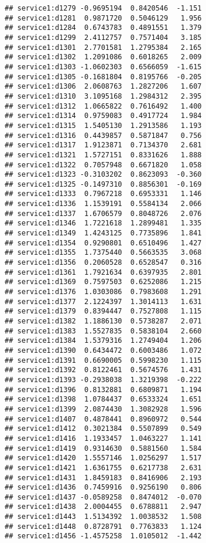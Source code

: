 \documentclass[
]{article}
\begin{document}
\begin{verbatim}
## service1:d1279 -0.9695194  0.8420546  -1.151
## service1:d1281  0.9871720  0.5046129   1.956
## service1:d1284  0.6743783  0.4891551   1.379
## service1:d1299  2.4112757  0.7571404   3.185
## service1:d1301  2.7701581  1.2795384   2.165
## service1:d1302  1.2091086  0.6018265   2.009
## service1:d1303 -1.0602303  0.6566059  -1.615
## service1:d1305 -0.1681804  0.8195766  -0.205
## service1:d1306  2.0608763  1.2827206   1.607
## service1:d1310  3.1095168  1.2984312   2.395
## service1:d1312  1.0665822  0.7616492   1.400
## service1:d1314  0.9759083  0.4917724   1.984
## service1:d1315  1.5405130  1.2913586   1.193
## service1:d1316  0.4439857  0.5871847   0.756
## service1:d1317  1.9123871  0.7134370   2.681
## service1:d1321  1.5727151  0.8331626   1.888
## service1:d1322  0.7057948  0.6671820   1.058
## service1:d1323 -0.3103202  0.8623093  -0.360
## service1:d1325 -0.1497310  0.8856301  -0.169
## service1:d1333  0.7967218  0.6953331   1.146
## service1:d1336  1.1539191  0.5584134   2.066
## service1:d1337  1.6706579  0.8048726   2.076
## service1:d1346  1.7221618  1.2899481   1.335
## service1:d1349  1.4243125  0.7735896   1.841
## service1:d1354  0.9290801  0.6510496   1.427
## service1:d1355  1.7375440  0.5663535   3.068
## service1:d1356  0.2060528  0.6528547   0.316
## service1:d1361  1.7921634  0.6397935   2.801
## service1:d1369  0.7597503  0.6252086   1.215
## service1:d1376  1.0303086  0.7983608   1.291
## service1:d1377  2.1224397  1.3014113   1.631
## service1:d1379  0.8394447  0.7527808   1.115
## service1:d1382  1.1886130  0.5738287   2.071
## service1:d1383  1.5527835  0.5838104   2.660
## service1:d1384  1.5379316  1.2749404   1.206
## service1:d1390  0.6434472  0.6003486   1.072
## service1:d1391  0.6690005  0.5998230   1.115
## service1:d1392  0.8122461  0.5674576   1.431
## service1:d1393 -0.2938038  1.3219398  -0.222
## service1:d1396  0.8132881  0.6809871   1.194
## service1:d1398  1.0784437  0.6533324   1.651
## service1:d1399  2.0874430  1.3082928   1.596
## service1:d1407  0.4878441  0.8960972   0.544
## service1:d1412  0.3021384  0.5507899   0.549
## service1:d1416  1.1933457  1.0463227   1.141
## service1:d1419  0.9314630  0.5881560   1.584
## service1:d1420  1.5557146  1.0256297   1.517
## service1:d1421  1.6361755  0.6217738   2.631
## service1:d1431  1.8459183  0.8416906   2.193
## service1:d1436  0.7459916  0.9256190   0.806
## service1:d1437 -0.0589258  0.8474012  -0.070
## service1:d1438  2.0004455  0.6788811   2.947
## service1:d1443  1.5134392  1.0038532   1.508
## service1:d1448  0.8728791  0.7763833   1.124
## service1:d1456 -1.4575258  1.0105012  -1.442

\end{verbatim}
\end{document}
